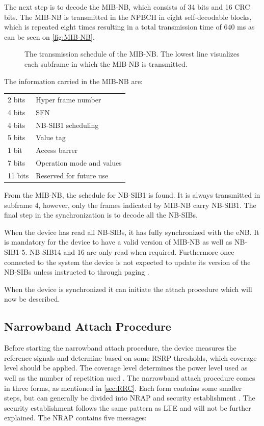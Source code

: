 The next step is to decode the \gls{MIB-NB}, which consists of 34 bits and 16 \gls{CRC} bits. The MIB-NB is transmitted in the NPBCH in eight self-decodable blocks, which is repeated eight times resulting in a total transmission time of 640 ms as can be seen on \autoref{fig:MIB-NB}. 
 
\begin{figure}[H]
\centering

\caption{The transmission schedule of the MIB-NB. The lowest line visualizes each subframe in which the MIB-NB is transmitted.}
\label{fig:MIB-NB}
\end{figure}

The information carried in the \gls{MIB-NB} are:

\begin{tabular}{ll}\\
2 bits & Hyper frame number\\
4 bits & \gls{SFN}\\
4 bits & \gls{NB-SIB}1 scheduling\\
5 bits & Value tag\\
1 bit & Access barrer\\
7 bits & Operation mode and values\\
11 bits & Reserved for future use\\
\end{tabular}

From the \gls{MIB-NB}, the schedule for \gls{NB-SIB}1 is found. It is always transmitted in subframe 4, however, only the frames indicated by \gls{MIB-NB} carry \gls{NB-SIB}1. The final step in the synchronization is to decode all the \gls{NB-SIB}s.

When the device has read all \gls{NB-SIB}s, it has fully synchronized with the \gls{eNB}. It is mandatory for the device to have a valid version of \gls{MIB-NB} as well as \gls{NB-SIB}1-5. \gls{NB-SIB}14 and 16 are only read when required. Furthermore once connected to the system the device is not expected to update its version of the \gls{NB-SIB}s unless instructed to through paging \citep{whitepaper}. 

When the device is synchronized it can initiate the attach procedure which will now be described. 




\subsection{Narrowband Attach Procedure} \label{sec:RAP}
Before starting the narrowband attach procedure, the device measures the reference signals and determine based on some \gls{RSRP} thresholds, which coverage level should be applied. The coverage level determines the power level used as well as the number of repetition used \citep{NB-IoT_Book}. The narrowband attach procedure comes in three forms, as mentioned in \autoref{sec:RRC}. Each form contains some smaller steps, but can generally be divided into \gls{NRAP} and security establishment \citep{REL-13}. The security establishment follows the same pattern as LTE and will not be further explained. The \gls{NRAP} contains five messages:

